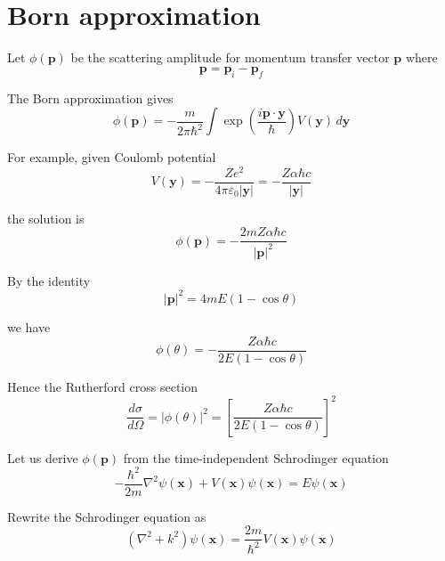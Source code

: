 

\section*{Born approximation}

Let $\phi(\mathbf p)$ be the scattering amplitude for momentum
transfer vector $\mathbf p$ where
\begin{equation*}
\mathbf p=\mathbf p_i-\mathbf p_f
\end{equation*}

The Born approximation gives
\begin{equation*}
\phi(\mathbf p)=-\frac{m}{2\pi\hbar^2}
\int\exp\left(\frac{i\mathbf p\cdot\mathbf y}{\hbar}\right)V(\mathbf y)\,d\mathbf y
\end{equation*}

For example, given Coulomb potential
\begin{equation*}
V(\mathbf y)
=-\frac{Ze^2}{4\pi\varepsilon_0|\mathbf y|}
=-\frac{Z\alpha\hbar c}{|\mathbf y|}
\end{equation*}

the solution is
\begin{equation*}
\phi(\mathbf p)=-\frac{2mZ\alpha\hbar c}{|\mathbf p|^2}
\end{equation*}

By the identity
\begin{equation*}
|\mathbf p|^2=4mE(1-\cos\theta)
\end{equation*}

we have
\begin{equation*}
\phi(\theta)=-\frac{Z\alpha\hbar c}{2E(1-\cos\theta)}
\end{equation*}

Hence the Rutherford cross section
\begin{equation*}
\frac{d\sigma}{d\Omega}=|\phi(\theta)|^2=\left[\frac{Z\alpha\hbar c}{2E(1-\cos\theta)}\right]^2
\tag{1}
\end{equation*}

Let us derive $\phi(\mathbf p)$ from the time-independent Schrodinger equation
\begin{equation*}
-\frac{\hbar^2}{2m}\nabla^2\psi(\mathbf x)+V(\mathbf x)\psi(\mathbf x)=E\psi(\mathbf x)
\end{equation*}

Rewrite the Schrodinger equation as
\begin{equation*}
\left(\nabla^2+k^2\right)\psi(\mathbf x)=\frac{2m}{\hbar^2}V(\mathbf x)\psi(\mathbf x)
\end{equation*}


